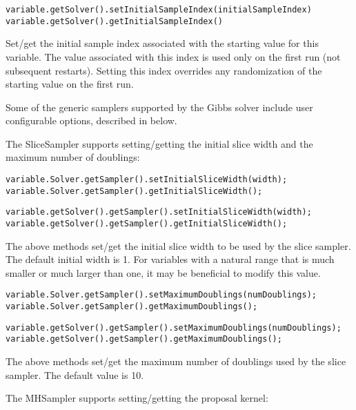 \ifjava
\begin{lstlisting}
variable.getSolver().setInitialSampleIndex(initialSampleIndex)
variable.getSolver().getInitialSampleIndex()
\end{lstlisting}
\fi

Set/get the initial sample index associated with the starting value for this variable.  The value associated with this index is used only on the first run (not subsequent restarts).  Setting this index overrides any randomization of the starting value on the first run.



Some of the generic samplers supported by the Gibbs solver include user configurable options, described in below.

The SliceSampler supports setting/getting the initial slice width and the maximum number of doublings:

\ifmatlab
\begin{lstlisting}
variable.Solver.getSampler().setInitialSliceWidth(width);
variable.Solver.getSampler().getInitialSliceWidth();
\end{lstlisting}
\fi

\ifjava
\begin{lstlisting}
variable.getSolver().getSampler().setInitialSliceWidth(width);
variable.getSolver().getSampler().getInitialSliceWidth();
\end{lstlisting}
\fi

The above methods set/get the initial slice width to be used by the slice sampler.  The default initial width is 1.  For variables with a natural range that is much smaller or much larger than one, it may be beneficial to modify this value.

\ifmatlab
\begin{lstlisting}
variable.Solver.getSampler().setMaximumDoublings(numDoublings);
variable.Solver.getSampler().getMaximumDoublings();
\end{lstlisting}
\fi

\ifjava
\begin{lstlisting}
variable.getSolver().getSampler().setMaximumDoublings(numDoublings);
variable.getSolver().getSampler().getMaximumDoublings();
\end{lstlisting}
\fi

The above methods set/get the maximum number of doublings used by the slice sampler.  The default value is 10.

The MHSampler supports setting/getting the proposal kernel:

